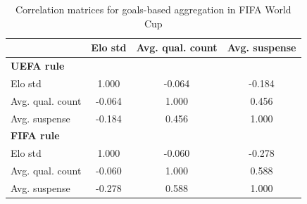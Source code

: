 \begin{table}[H]
\centering
\small
\caption{Correlation matrices for goals-based aggregation in FIFA World Cup}
\label{tab:corr_wc}
\begin{tabular}{lccc}
\toprule
 & Elo std & Avg. qual. count & Avg. suspense \\
\midrule
\multicolumn{4}{l}{\textbf{UEFA rule}} \\
Elo std             & 1.000 & -0.064 & -0.184 \\
Avg. qual. count    & -0.064 & 1.000 & 0.456 \\
Avg. suspense       & -0.184 & 0.456 & 1.000 \\
\midrule
\multicolumn{4}{l}{\textbf{FIFA rule}} \\
Elo std             & 1.000 & -0.060 & -0.278 \\
Avg. qual. count    & -0.060 & 1.000 & 0.588 \\
Avg. suspense       & -0.278 & 0.588 & 1.000 \\
\bottomrule
\end{tabular}
\end{table}
